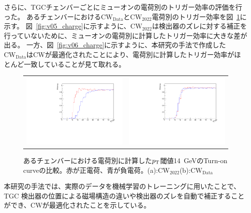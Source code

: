 さらに、TGCチェンバーごとにミューオンの電荷別のトリガー効率の評価を行った。
あるチェンバーにおける$\mathrm{CW_{Data}}$と$\mathrm{CW_{2022}}$電荷別のトリガー効率を図~\ref{Eff_Chage}に示す。
図~\ref{fig:v05_charge}に示すように、$\mathrm{CW_{2022}}$は検出器のズレに対する補正を行っていないために、ミューオンの電荷別に計算したトリガー効率に大きな差が出る。
一方、図~\ref{fig:v06_charge}に示すように、本研究の手法で作成した$\mathrm{CW_{Data}}$はCWが最適化されたことにより、電荷別に計算したトリガー効率がほとんど一致していることが見て取れる。
\begin{figure}
    \begin{tabular}{cc}
    \begin{minipage}[b]{0.45\hsize}
        \includegraphics[clip, width=7cm]{fig/5/Eff_PNcharge_v05_phi0eta10.pdf}
        \subcaption{}
        \label{fig:v05_charge}
    \end{minipage}&
    \begin{minipage}[b]{0.45\hsize}
        \includegraphics[clip, width=7cm]{fig/5/Eff_PNcharge_MLP_phi0eta10.pdf}
        \subcaption{}
        \label{fig:v06_charge}
    \end{minipage}
    \end{tabular}
    \caption{あるチェンバーにおける電荷別に計算した$p_{\rm{T}}$閾値14~GeVのTurn-on curveの比較。赤が正電荷、青が負電荷。(a):$\mathrm{CW_{2022}}$(b):$\mathrm{CW_{Data}}$}
    \label{Eff_Chage}
\end{figure}
本研究の手法では、実際のデータを機械学習のトレーニングに用いたことで、TGC 検出器の位置による磁場構造の違いや検出器のズレを自動で補正することができ、CWが最適化されたことを示している。



